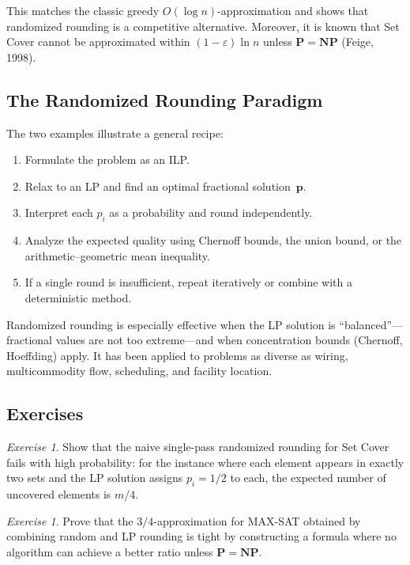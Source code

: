 \documentclass[twoside,12pt]{book}
\theoremstyle{plain}
\theoremstyle{definition}
\theoremstyle{remark}
\newtheorem{exercise}[theorem]{Exercise}
\begin{document}
This matches the classic greedy $O(\log n)$-approximation and shows
that randomized rounding is a competitive alternative.  Moreover, it
is known that Set Cover cannot be approximated within
$(1-\varepsilon)\ln n$ unless $\mathbf{P} = \mathbf{NP}$ (Feige,
1998).

\subsection{The Randomized Rounding Paradigm}

The two examples illustrate a general recipe:
\begin{enumerate}
\item Formulate the problem as an ILP.
\item Relax to an LP and find an optimal fractional solution~$\mathbf{p}$.
\item Interpret each $p_i$ as a probability and round independently.
\item Analyze the expected quality using Chernoff bounds, the
      union bound, or the arithmetic--geometric mean inequality.
\item If a single round is insufficient, repeat iteratively or
      combine with a deterministic method.
\end{enumerate}

Randomized rounding is especially effective when the LP solution is
``balanced''---fractional values are not too extreme---and when
concentration bounds (Chernoff, Hoeffding) apply.  It has been
applied to problems as diverse as wiring, multicommodity flow,
scheduling, and facility location.

\subsection{Exercises}

\begin{exercise}
Show that the naive single-pass randomized rounding for Set Cover
fails with high probability: for the instance where each element
appears in exactly two sets and the LP solution assigns $p_i = 1/2$
to each, the expected number of uncovered elements is $m/4$.
\end{exercise}

\begin{exercise}
Prove that the $3/4$-approximation for MAX-SAT obtained by combining
random and LP rounding is tight by constructing a formula where
no algorithm can achieve a better ratio unless $\mathbf{P} = \mathbf{NP}$.
\end{exercise}
\end{document}
